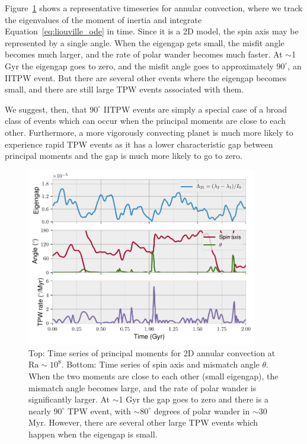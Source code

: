 \documentclass[extra,mreferee]{gji}
\begin{document}
Figure~\ref{fig:misfit} shows a representative timeseries for annular convection, where 
we track the eigenvalues of the moment of inertia and integrate Equation~\eqref{eq:liouville_ode} in time.
Since it is a 2D model, the spin axis may be represented by a single angle.
When the eigengap gets small, the misfit angle becomes much larger, and the rate of polar wander becomes much faster.
At $\sim$1 Gyr the eigengap goes to zero, and the misfit angle goes to approximately $90^\circ$, 
an IITPW event. But there are several other events where the eigengap becomes small, and there are 
still large TPW events associated with them.

We suggest, then, that $90^\circ$ IITPW events are simply a special case of a broad class of events which can occur
when the principal moments are close to each other.  Furthermore, a more vigorously convecting planet is much more likely to experience rapid TPW events
as it has a lower characteristic gap between principal moments and the gap is much more likely to go to zero.

\begin{figure}
\centering
\includegraphics[width=0.9\textwidth]{figures/misfit.pdf}
\caption{Top: Time series of principal moments for 2D annular convection at $\mathrm{Ra}\sim10^8$.  Bottom: Time series of spin axis and mismatch angle $\theta$.  When the two moments are close to each other (small eigengap), the mismatch angle becomes large, and the rate of polar wander is significantly larger. At $\sim$1 Gyr the gap goes to zero and there is a nearly $90^\circ$ TPW event, with $\sim80^\circ$ degrees of polar wander in $\sim$30 Myr. However, there are several other large TPW events which happen when the eigengap is small.}
\label{fig:misfit}
\end{figure}
\end{document}
